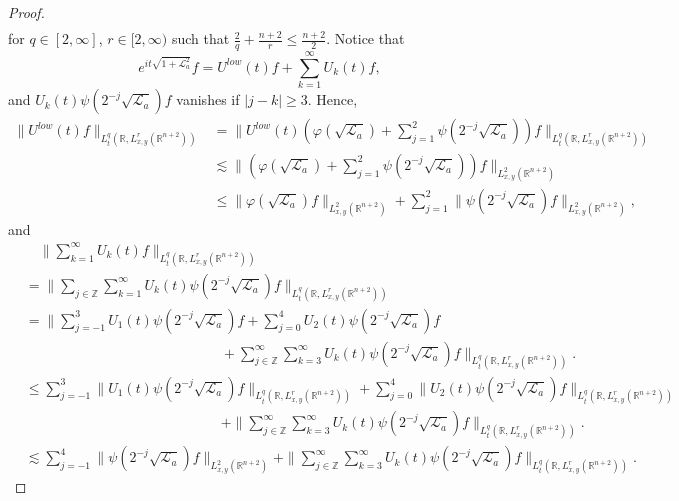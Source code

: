 \documentclass[a4paper,11pt, reqno]{amsart}
\numberwithin{equation}{section}
\theoremstyle{plain}
\theoremstyle{definition}
\theoremstyle{remark}
\begin{document}
\begin{proof}
\begin{align*}
\end{align*}
for $q\in[2,\infty]$, $r\in [2,\infty)$ such that $\frac{2}{q}+\frac{n+2}{r}\leq \frac{n+2}{2}$. Notice that
\begin{equation*}
e^{it\sqrt{1+\mathcal{L}^2_a}}f=U^{low}(t)f+\sum_{k=1}^\infty U_k(t)f,
\end{equation*}
and $U_k(t)\psi(2^{-j}\sqrt{\mathcal{L}_a})f$ vanishes if $|j-k|\geq3$. Hence, 
\begin{align*}
\|U^{low}(t)f\|_{L_t^q(\mathbb{R},L^r_{x,y}(\mathbb{R}^{n+2}))}&=\|U^{low}(t)(\varphi(\sqrt{\mathcal{L}_a})+\sum_{j=1}^2\psi(2^{-j}\sqrt{\mathcal{L}_a}))f\|_{L_t^q(\mathbb{R},L^r_{x,y}(\mathbb{R}^{n+2}))}\\
&\lesssim \|(\varphi(\sqrt{\mathcal{L}_a})+\sum_{j=1}^2\psi(2^{-j}\sqrt{\mathcal{L}_a}))f\|_{L^2_{x,y}(\mathbb{R}^{n+2})}\\
&\leq \|\varphi(\sqrt{\mathcal{L}_a})f\|_{L^2_{x,y}(\mathbb{R}^{n+2})}+\sum_{j=1}^2\|\psi(2^{-j}\sqrt{\mathcal{L}_a})f\|_{L^2_{x,y}(\mathbb{R}^{n+2})},
\end{align*}
and
\begin{align*}
&\quad \|\sum_{k=1}^\infty U_k(t)f\|_{L_t^q(\mathbb{R},L^r_{x,y}(\mathbb{R}^{n+2}))}\\
&=\|\sum_{j\in\mathbb{Z}}\sum_{k=1}^\infty U_k(t)\psi(2^{-j}\sqrt{\mathcal{L}_a})f\|_{L_t^q(\mathbb{R},L^r_{x,y}(\mathbb{R}^{n+2}))}\\
&=\Big\|\sum_{j=-1}^3U_1(t)\psi(2^{-j}\sqrt{\mathcal{L}_a})f+\sum_{j=0}^4U_2(t)\psi(2^{-j}\sqrt{\mathcal{L}_a})f\\
&\qquad\qquad\qquad\qquad\qquad\qquad\qquad+\sum_{j\in\mathbb{Z}}^\infty\sum_{k=3}^\infty U_k(t)\psi(2^{-j}\sqrt{\mathcal{L}_a})f\Big\|_{L_t^q(\mathbb{R},L^r_{x,y}(\mathbb{R}^{n+2}))}.\\
&\leq \sum_{j=-1}^3\|U_1(t)\psi(2^{-j}\sqrt{\mathcal{L}_a})f\|_{L_t^q(\mathbb{R},L^r_{x,y}(\mathbb{R}^{n+2}))}+\sum_{j=0}^4\|U_2(t)\psi(2^{-j}\sqrt{\mathcal{L}_a})f\|_{L_t^q(\mathbb{R},L^r_{x,y}(\mathbb{R}^{n+2}))}\\
&\qquad\qquad\qquad\qquad\qquad\qquad\qquad+\|\sum_{j\in\mathbb{Z}}^\infty\sum_{k=3}^\infty U_k(t)\psi(2^{-j}\sqrt{\mathcal{L}_a})f\|_{L_t^q(\mathbb{R},L^r_{x,y}(\mathbb{R}^{n+2}))}.\\
&\lesssim \sum_{j=-1}^4\|\psi(2^{-j}\sqrt{\mathcal{L}_a})f\|_{L^2_{x,y}(\mathbb{R}^{n+2})}+\|\sum_{j\in\mathbb{Z}}^\infty\sum_{k=3}^\infty U_k(t)\psi(2^{-j}\sqrt{\mathcal{L}_a})f\|_{L_t^q(\mathbb{R},L^r_{x,y}(\mathbb{R}^{n+2}))}.
\end{align*}

\end{proof}
\end{document}
